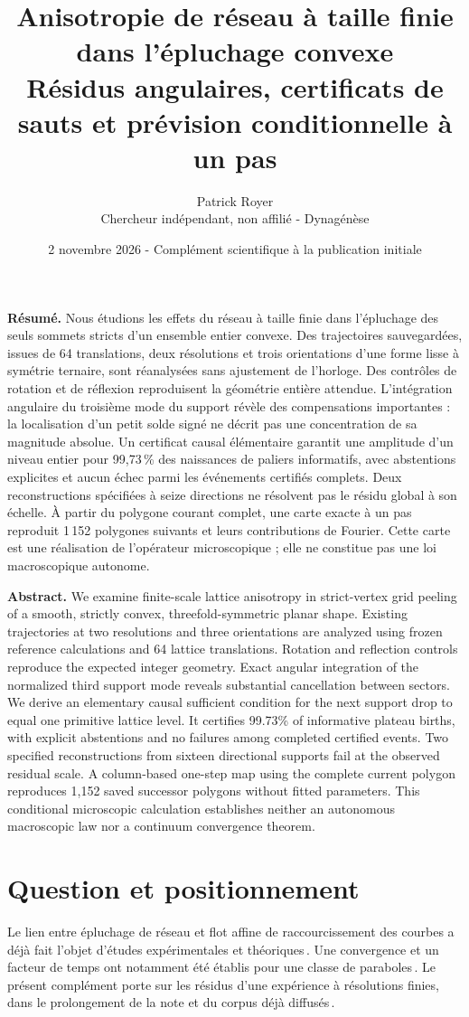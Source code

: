 \documentclass[11pt,a4paper]{article}
\title{\vspace{-14mm}\textbf{Anisotropie de réseau à taille finie dans l'épluchage convexe}\\[3mm]
\large Résidus angulaires, certificats de sauts et prévision conditionnelle à un pas}
\author{Patrick Royer\\\small Chercheur indépendant, non affilié - Dynagénèse}
\date{2 novembre 2026 - Complément scientifique à la publication initiale}
\begin{document}
\maketitle\thispagestyle{fancy}
\vspace{-5mm}
\textbf{Résumé.} Nous étudions les effets du réseau à taille finie dans l'épluchage des seuls sommets stricts d'un ensemble entier convexe. Des trajectoires sauvegardées, issues de 64 translations, deux résolutions et trois orientations d'une forme lisse à symétrie ternaire, sont réanalysées sans ajustement de l'horloge. Des contrôles de rotation et de réflexion reproduisent la géométrie entière attendue. L'intégration angulaire du troisième mode du support révèle des compensations importantes : la localisation d'un petit solde signé ne décrit pas une concentration de sa magnitude absolue. Un certificat causal élémentaire garantit une amplitude d'un niveau entier pour 99,73\,\% des naissances de paliers informatifs, avec abstentions explicites et aucun échec parmi les événements certifiés complets. Deux reconstructions spécifiées à seize directions ne résolvent pas le résidu global à son échelle. À partir du polygone courant complet, une carte exacte à un pas reproduit 1\,152 polygones suivants et leurs contributions de Fourier. Cette carte est une réalisation de l'opérateur microscopique ; elle ne constitue pas une loi macroscopique autonome.

\textbf{Abstract.} We examine finite-scale lattice anisotropy in strict-vertex grid peeling of a smooth, strictly convex, threefold-symmetric planar shape. Existing trajectories at two resolutions and three orientations are analyzed using frozen reference calculations and 64 lattice translations. Rotation and reflection controls reproduce the expected integer geometry. Exact angular integration of the normalized third support mode reveals substantial cancellation between sectors. We derive an elementary causal sufficient condition for the next support drop to equal one primitive lattice level. It certifies 99.73\% of informative plateau births, with explicit abstentions and no failures among completed certified events. Two specified reconstructions from sixteen directional supports fail at the observed residual scale. A column-based one-step map using the complete current polygon reproduces 1,152 saved successor polygons without fitted parameters. This conditional microscopic calculation establishes neither an autonomous macroscopic law nor a continuum convergence theorem.

\section{Question et positionnement}
Le lien entre épluchage de réseau et flot affine de raccourcissement des courbes a déjà fait l'objet d'études expérimentales et théoriques\,\cite{eppstein}. Une convergence et un facteur de temps ont notamment été établis pour une classe de paraboles\,\cite{rote}. Le présent complément porte sur les résidus d'une expérience à résolutions finies, dans le prolongement de la note et du corpus déjà diffusés\,\cite{royer}.
\end{document}
